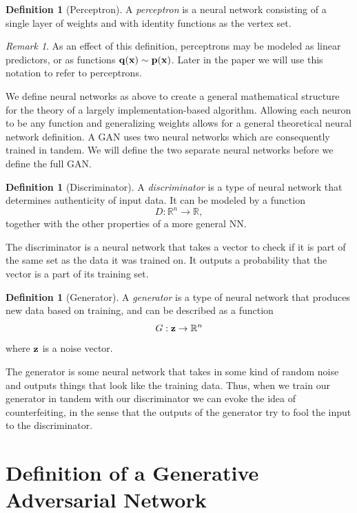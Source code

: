 \documentclass[12pt]{amsart}
\newcommand{\RR}{{\mathbb R}}
\newcommand{\bfx}{{\bf x}}
\theoremstyle{definition}
\newtheorem{definition}[theorem]{Definition}
\theoremstyle{remark}
\newtheorem{remark}[theorem]{Remark}
\begin{document}
\begin{definition}[Perceptron]
        A {\em perceptron} is a neural network consisting of a single layer of 
        weights and with identity functions as the vertex set.
\end{definition}

\begin{remark}
        As an effect of this definition, perceptrons may be modeled as linear 
        predictors, or as functions ${\bf q}(\bfx)\sim {\bf p}(\bfx)$. Later in 
        the paper we will use this notation to refer to perceptrons.
\end{remark}

We define neural networks as above to create a general mathematical structure for
the theory of a largely implementation-based algorithm. Allowing each neuron to 
be any function and generalizing weights allows for a general theoretical neural
network definition. A GAN uses two neural networks which are consequently trained
in tandem. We will define the two separate neural networks before we define the 
full GAN.

\begin{definition}[Discriminator]
        A {\em discriminator} is a type of neural network that determines 
        authenticity of input data. It can be modeled by a function 
        $$ D:\RR^n \to \RR, $$ together with the other properties of a more 
        general NN.
\end{definition}

The discriminator is a neural network that takes a vector to check if 
it is part of the same set as the data it was trained on. 
It outputs a probability that the vector is a part of its training set.

\begin{definition}[Generator]
        A {\em generator} is a type of neural network that produces
        new data based on training, and can be described as a function
        $$ G:{\bf z} \to \RR^n $$
        where ${\bf z}$ is a noise vector.
\end{definition}

The generator is some neural network that takes in some kind
of random noise and outputs things that look like the training
data. Thus, when we train our generator in tandem with our
discriminator we can evoke the idea of counterfeiting, in the
sense that the outputs of the generator try to fool
the input to the discriminator.

\section{Definition of a Generative Adversarial Network}
\end{document}
